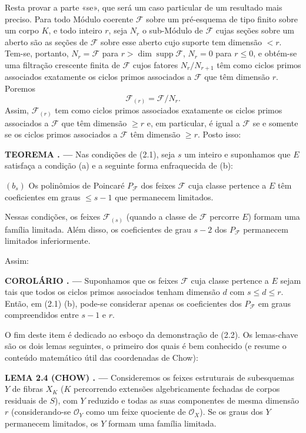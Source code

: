 \documentclass[11pt,twoside,openany]{book}
\numberwithin{equation}{section}
\newcommand{\src}[1]{%
  \phantomsection\hypertarget{src:#1}{}%
  \marginpar{\raggedleft\footnotesize\sffamily #1}%
}
\theoremstyle{plain}
\theoremstyle{definition}
\theoremstyle{remark}
\newcommand{\result}[2]{%
  \par\medskip\noindent\textbf{#1%
  \if\relax\detokenize{#2}\relax\else\space#2\fi. ---}\enspace
}
\newcommand{\FgaUnitKey}{frontmatter}
\renewcommand{\src}[1]{%
  \phantomsection\hypertarget{src:\FgaUnitKey:#1}{}%
  \marginpar{\raggedleft\footnotesize\sffamily #1}%
}
\begin{document}
Resta provar a parte «se», que será um caso particular de um resultado mais
preciso. Para todo Módulo coerente $\mathcal F$ sobre um pré-esquema de tipo
finito sobre um corpo $K$, e todo inteiro $r$, seja $N_r$ o sub-Módulo de
$\mathcal F$ cujas seções sobre um aberto são as seções de $\mathcal F$ sobre
esse aberto cujo suporte tem dimensão $<r$. Tem-se, portanto,
$N_r=\mathcal F$ para $r>\dim\operatorname{supp}\mathcal F$, $N_r=0$ para
$r\leq0$, e obtém-se uma filtração crescente finita de $\mathcal F$ cujos
fatores $N_r/N_{r+1}$ têm como ciclos primos associados exatamente os ciclos primos
associados a $\mathcal F$ que têm dimensão $r$. Poremos
\[
\mathcal F_{(r)}=\mathcal F/N_r.
\]
Assim, $\mathcal F_{(r)}$ tem como ciclos primos associados exatamente os
ciclos primos associados a $\mathcal F$ que têm dimensão $\geq r$ e, em
particular, é igual a $\mathcal F$ se e somente se os ciclos primos associados
a $\mathcal F$ têm dimensão $\geq r$. Posto isso:

\result{TEOREMA}{2.2} Nas condições de (2.1), seja $s$ um inteiro e suponhamos
que $E$ satisfaça a condição (a) e a seguinte forma enfraquecida de (b):

\medskip
\noindent $(b_s)$ Os polinômios de Poincaré $P_{\mathcal F}$ dos feixes
$\mathcal F$ cuja classe pertence a $E$ têm coeficientes em graus
$\leq s-1$ que permanecem limitados.

Nessas condições, os feixes $\mathcal F_{(s)}$ (quando a classe de
$\mathcal F$ percorre $E$) formam uma família limitada. Além disso, os
coeficientes de grau $s-2$ dos $P_{\mathcal F}$ permanecem limitados
inferiormente.
\src{255}
Assim:

\result{COROLÁRIO}{2.3} Suponhamos que os feixes $\mathcal F$ cuja classe
pertence a $E$ sejam tais que todos os ciclos primos associados tenham dimensão
$d$ com $s\leq d\leq r$. Então, em (2.1) (b), pode-se considerar apenas os
coeficientes dos $P_{\mathcal F}$ em graus compreendidos entre $s-1$ e $r$.

O fim deste item é dedicado ao esboço da demonstração de (2.2). Os lemas-chave
são os dois lemas seguintes, o primeiro dos quais é bem conhecido (e resume o
conteúdo matemático útil das coordenadas de Chow):

\result{LEMA 2.4 (CHOW)}{} Consideremos os feixes estruturais de subesquemas
$Y$ de fibras $X_K$ ($K$ percorrendo extensões algebricamente fechadas de
corpos residuais de $S$), com $Y$ reduzido e todas as suas componentes de mesma
dimensão $r$ (considerando-se $\mathcal O_Y$ como um feixe quociente de
$\mathcal O_X$). Se os graus dos $Y$ permanecem limitados, os $Y$ formam uma
família limitada.
\end{document}
